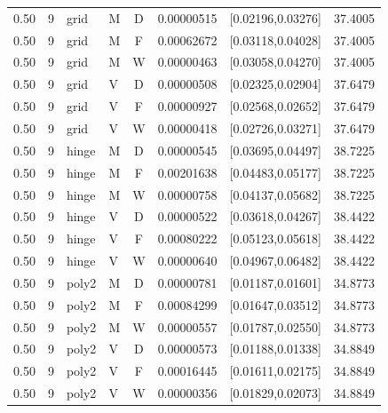 \begin{longtable}{rrllcrrr}
0.50 & 9 & grid & M & D & 0.00000515 & [0.02196,0.03276] & 37.4005 \\

0.50 & 9 & grid & M & F & 0.00062672 & [0.03118,0.04028] & 37.4005 \\

0.50 & 9 & grid & M & W & 0.00000463 & [0.03058,0.04270] & 37.4005 \\

0.50 & 9 & grid & V & D & 0.00000508 & [0.02325,0.02904] & 37.6479 \\

0.50 & 9 & grid & V & F & 0.00000927 & [0.02568,0.02652] & 37.6479 \\

0.50 & 9 & grid & V & W & 0.00000418 & [0.02726,0.03271] & 37.6479 \\

0.50 & 9 & hinge & M & D & 0.00000545 & [0.03695,0.04497] & 38.7225 \\

0.50 & 9 & hinge & M & F & 0.00201638 & [0.04483,0.05177] & 38.7225 \\

0.50 & 9 & hinge & M & W & 0.00000758 & [0.04137,0.05682] & 38.7225 \\

0.50 & 9 & hinge & V & D & 0.00000522 & [0.03618,0.04267] & 38.4422 \\

0.50 & 9 & hinge & V & F & 0.00080222 & [0.05123,0.05618] & 38.4422 \\

0.50 & 9 & hinge & V & W & 0.00000640 & [0.04967,0.06482] & 38.4422 \\

0.50 & 9 & poly2 & M & D & 0.00000781 & [0.01187,0.01601] & 34.8773 \\

0.50 & 9 & poly2 & M & F & 0.00084299 & [0.01647,0.03512] & 34.8773 \\

0.50 & 9 & poly2 & M & W & 0.00000557 & [0.01787,0.02550] & 34.8773 \\

0.50 & 9 & poly2 & V & D & 0.00000573 & [0.01188,0.01338] & 34.8849 \\

0.50 & 9 & poly2 & V & F & 0.00016445 & [0.01611,0.02175] & 34.8849 \\

0.50 & 9 & poly2 & V & W & 0.00000356 & [0.01829,0.02073] & 34.8849 \\


\end{longtable}
